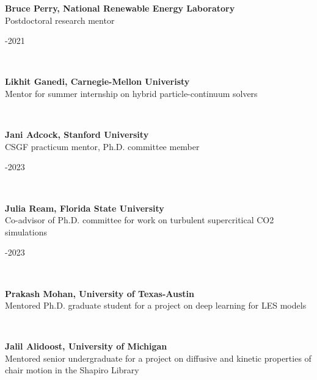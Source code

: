 \documentclass[11pt,letterpaper]{article}
\begin{document}
\begin{minipage}[t]{0.82\textwidth}%
  \textbf{Bruce Perry, National Renewable Energy Laboratory}\\%
  Postdoctoral research mentor%
\end{minipage}\hfill%
\begin{minipage}[t]{0.15\textwidth}-2021%
\end{minipage}\\[2ex]%
\begin{minipage}[t]{0.82\textwidth}%
  \textbf{Likhit Ganedi, Carnegie-Mellon Univeristy}\\%
  Mentor for summer internship on hybrid particle-continuum solvers%
\end{minipage}\hfill%
\begin{minipage}[t]{0.15\textwidth}%
\end{minipage}\\[2ex]%
\begin{minipage}[t]{0.82\textwidth}%
  \textbf{Jani Adcock, Stanford University}\\%
  CSGF practicum mentor, Ph.D. committee member%
\end{minipage}\hfill%
\begin{minipage}[t]{0.15\textwidth}-2023%
\end{minipage}\\[2ex]%
\begin{minipage}[t]{0.82\textwidth}%
  \textbf{Julia Ream, Florida State University}\\%
  Co-advisor of Ph.D. committee for work on turbulent supercritical CO2 simulations%
\end{minipage}\hfill%
\begin{minipage}[t]{0.15\textwidth}-2023%
\end{minipage}\\[2ex]%
\begin{minipage}[t]{0.82\textwidth}%
  \textbf{Prakash Mohan, University of Texas-Austin}\\%
  Mentored Ph.D. graduate student for a project on deep learning for LES models%
\end{minipage}\hfill%
\begin{minipage}[t]{0.15\textwidth}%
\end{minipage}\\[2ex]%
\begin{minipage}[t]{0.82\textwidth}%
  \textbf{Jalil Alidoost, University of Michigan}\\%
  Mentored senior undergraduate for a project on diffusive and kinetic properties of chair motion in the Shapiro Library%
\end{minipage}\hfill%
\end{document}
